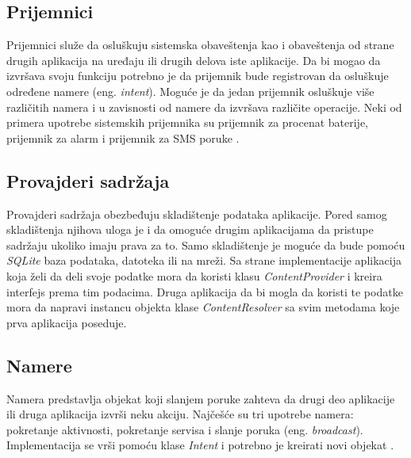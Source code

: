 \documentclass[android.tex]{subfiles}
\begin{document}
\subsection{Prijemnici}
Prijemnici služe da osluškuju sistemska obaveštenja kao i obaveštenja od strane drugih aplikacija na uređaju ili drugih delova iste aplikacije. Da bi mogao da izvršava svoju funkciju potrebno je da prijemnik bude registrovan da osluškuje određene namere (eng. \textit{intent}). Moguće je da jedan prijemnik osluškuje više različitih namera i u zavisnosti od namere da izvršava različite operacije. Neki od primera upotrebe sistemskih prijemnika su prijemnik za procenat baterije, prijemnik za alarm i prijemnik za SMS poruke \cite{book:mzivkovic}. 

\subsection{Provajderi sadržaja}
Provajderi sadržaja obezbeđuju skladištenje podataka aplikacije. Pored samog skladištenja njihova uloga je i da omoguće drugim aplikacijama da pristupe sadržaju ukoliko imaju prava za to. Samo skladištenje je moguće da bude pomoću \textit{SQLite} baza podataka, datoteka ili na mreži. Sa strane implementacije aplikacija koja želi da deli svoje podatke mora da koristi klasu \textit{ContentProvider} i kreira interfejs prema tim podacima. Druga aplikacija da bi mogla da  koristi te podatke mora da napravi instancu objekta klase \textit{ContentResolver} sa svim metodama koje prva aplikacija poseduje. 

\subsection{Namere}
\label{sec:namere}
Namera predstavlja objekat koji slanjem poruke zahteva da drugi deo aplikacije ili druga aplikacija izvrši neku akciju. Najčešće su tri upotrebe namera: pokretanje aktivnosti, pokretanje servisa i slanje poruka (eng. \textit{broadcast}). Implementacija se vrši pomoću klase \textit{Intent} i potrebno je kreirati novi objekat \cite{sajt:androidDevelopers}. 
\end{document}
